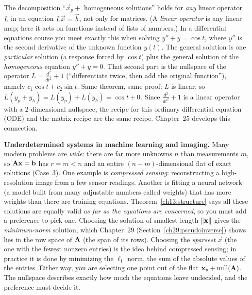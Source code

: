 \begin{connectionbox}
The decomposition ``$\vec{x}_p+$ homogeneous solutions'' holds for \emph{any} linear
operator $L$ in an equation $L\vec{x}=\vec{b}$, not only for matrices. (A \emph{linear
operator} is any linear map; here it acts on functions instead of lists of numbers.) In a
differential equations course you meet exactly this when solving $y''+y=\cos t$, where
$y''$ is the second derivative of the unknown function $y(t)$. The general solution is
one \emph{particular} solution (a response forced by $\cos t$) plus the general solution of
the \emph{homogeneous} equation $y''+y=0$. That second part is the nullspace of the operator
$L=\tfrac{d^2}{dt^2}+1$ (``differentiate twice, then add the original function''), namely
$c_1\cos t+c_2\sin t$. Same theorem, same proof: $L$ is linear, so
$L(y_p+y_h)=L(y_p)+L(y_h)=\cos t+0$. Since $\tfrac{d^2}{dt^2}+1$ is a linear operator with
a $2$-dimensional nullspace, the recipe for this ordinary differential equation (ODE) and
the matrix recipe are the same recipe. Chapter~25 develops this connection.
\end{connectionbox}

\begin{applicationbox}
\textbf{Underdetermined systems in machine learning and imaging.} Many modern problems
are \emph{wide}: there are far more unknowns $n$ than measurements $m$, so
$\mathbf{A}\mathbf{x}=\mathbf{b}$ has $r=m<n$ and an entire $(n-m)$-dimensional flat of exact
solutions (Case~3). One example is \emph{compressed sensing}: reconstructing a
high-resolution image from a few sensor readings. Another is fitting a neural network (a
model built from many adjustable numbers called weights) that has more weights than there
are training equations. Theorem~\ref{ch13:structure} says all these
solutions are equally valid \emph{as far as the equations are concerned}, so you must add
a preference to pick one. Choosing the solution of smallest length $\lVert\mathbf{x}\rVert$ gives
the \emph{minimum-norm} solution, which Chapter~29 (Section~\ref{ch29:pseudoinverse}) shows lies in the row space of
$\mathbf{A}$ (the span of its rows). Choosing the \emph{sparsest} $\vec{x}$ (the one with the
fewest nonzero entries) is the idea behind compressed sensing; in practice it is done by
minimizing the $\ell_1$ norm, the sum of the absolute values of the entries. Either way, you
are selecting one point out of the flat $\mathbf{x}_p+\operatorname{null}(\mathbf{A})$. The nullspace
describes exactly how much the equations leave undecided, and the preference must decide
it.
\end{applicationbox}

